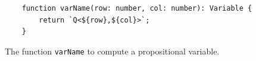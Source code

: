 \begin{figure}[!ht]
\centering
\begin{verbatim}
    function varName(row: number, col: number): Variable {
        return `Q<${row},${col}>`;
    }
\end{verbatim}
\vspace*{-0.3cm}
\caption{The function \texttt{varName} to compute a propositional variable.}
\label{fig:var}
\end{figure}



